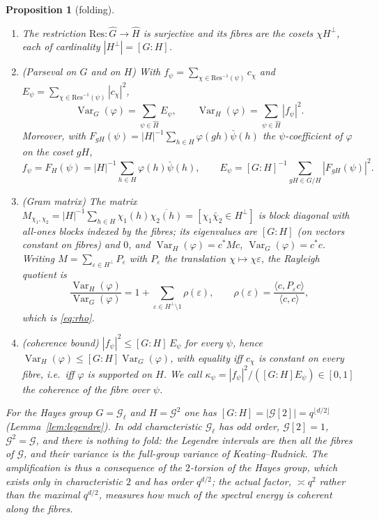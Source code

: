 \documentclass[11pt,a4paper]{amsart}
\newtheorem{proposition}[theorem]{Proposition}
\theoremstyle{definition}
\newcommand{\G}{\mathcal{G}}
\newcommand{\Var}{\operatorname{Var}}
\newcommand{\eps}{\varepsilon}
\begin{document}
\begin{proposition}[folding]\label{prop:folding}
\begin{enumerate}[label=\textup{(\alph*)},leftmargin=2em]
\item The restriction $\mathrm{Res}:\widehat G\to\widehat H$ is surjective and its fibres are the cosets $\chi H^\perp$, each of cardinality $|H^\perp|=[G:H]$.
\item (Parseval on $G$ and on $H$) With $f_\psi=\sum_{\chi\in\mathrm{Res}^{-1}(\psi)}c_\chi$ and $E_\psi=\sum_{\chi\in\mathrm{Res}^{-1}(\psi)}|c_\chi|^2$,
\[
\Var_G(\varphi)=\sum_{\psi\in\widehat H}E_\psi,\qquad \Var_H(\varphi)=\sum_{\psi\in\widehat H}|f_\psi|^2 .
\]
Moreover, with $F_{gH}(\psi)=|H|^{-1}\sum_{h\in H}\varphi(gh)\bar\psi(h)$ the $\psi$-coefficient of $\varphi$ on the coset $gH$,
\[
f_\psi=F_H(\psi)=|H|^{-1}\sum_{h\in H}\varphi(h)\bar\psi(h),\qquad E_\psi=[G:H]^{-1}\sum_{gH\in G/H}|F_{gH}(\psi)|^2 .
\]
\item (Gram matrix) The matrix $M_{\chi_1,\chi_2}=|H|^{-1}\sum_{h\in H}\chi_1(h)\overline{\chi_2(h)}=[\chi_1\bar\chi_2\in H^\perp]$ is block diagonal with all-ones blocks indexed by the fibres; its eigenvalues are $[G:H]$ (on vectors constant on fibres) and $0$, and $\Var_H(\varphi)=c^*Mc$, $\Var_G(\varphi)=c^*c$. Writing $M=\sum_{\eps\in H^\perp}P_\eps$ with $P_\eps$ the translation $\chi\mapsto\chi\eps$, the Rayleigh quotient is
\[
\frac{\Var_H(\varphi)}{\Var_G(\varphi)}=1+\sum_{\eps\in H^\perp\setminus1}\rho(\eps),\qquad \rho(\eps)=\frac{\langle c,P_\eps c\rangle}{\langle c,c\rangle},
\]
which is \eqref{eq:rho}.
\item (coherence bound) $|f_\psi|^2\le[G:H]\,E_\psi$ for every $\psi$, hence $\Var_H(\varphi)\le[G:H]\Var_G(\varphi)$, with equality iff $c_\chi$ is constant on every fibre, i.e.\ iff $\varphi$ is supported on $H$. We call $\kappa_\psi=|f_\psi|^2/([G:H]E_\psi)\in[0,1]$ the coherence of the fibre over $\psi$.
\end{enumerate}
For the Hayes group $G=\G_\ell$ and $H=\G^2$ one has $[G:H]=|\G[2]|=q^{\lfloor d/2\rfloor}$ (Lemma~\ref{lem:legendre}). In odd characteristic $\G_\ell$ has odd order, $\G[2]=1$, $\G^2=\G$, and there is nothing to fold: the Legendre intervals are then all the fibres of $\G$, and their variance is the full-group variance of Keating--Rudnick. The amplification is thus a consequence of the $2$-torsion of the Hayes group, which exists only in characteristic $2$ and has order $q^{d/2}$; the actual factor, $\asymp q^2$ rather than the maximal $q^{d/2}$, measures how much of the spectral energy is coherent along the fibres.
\end{proposition}
\end{document}
